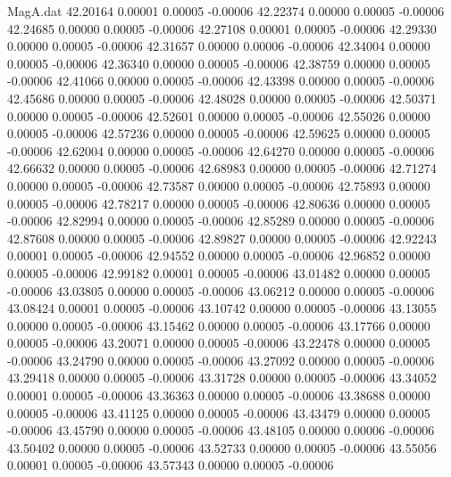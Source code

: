 \begin{filecontents}{MagA.dat}
  42.20164    0.00001    0.00005   -0.00006
  42.22374    0.00000    0.00005   -0.00006
  42.24685    0.00000    0.00005   -0.00006
  42.27108    0.00001    0.00005   -0.00006
  42.29330    0.00000    0.00005   -0.00006
  42.31657    0.00000    0.00006   -0.00006
  42.34004    0.00000    0.00005   -0.00006
  42.36340    0.00000    0.00005   -0.00006
  42.38759    0.00000    0.00005   -0.00006
  42.41066    0.00000    0.00005   -0.00006
  42.43398    0.00000    0.00005   -0.00006
  42.45686    0.00000    0.00005   -0.00006
  42.48028    0.00000    0.00005   -0.00006
  42.50371    0.00000    0.00005   -0.00006
  42.52601    0.00000    0.00005   -0.00006
  42.55026    0.00000    0.00005   -0.00006
  42.57236    0.00000    0.00005   -0.00006
  42.59625    0.00000    0.00005   -0.00006
  42.62004    0.00000    0.00005   -0.00006
  42.64270    0.00000    0.00005   -0.00006
  42.66632    0.00000    0.00005   -0.00006
  42.68983    0.00000    0.00005   -0.00006
  42.71274    0.00000    0.00005   -0.00006
  42.73587    0.00000    0.00005   -0.00006
  42.75893    0.00000    0.00005   -0.00006
  42.78217    0.00000    0.00005   -0.00006
  42.80636    0.00000    0.00005   -0.00006
  42.82994    0.00000    0.00005   -0.00006
  42.85289    0.00000    0.00005   -0.00006
  42.87608    0.00000    0.00005   -0.00006
  42.89827    0.00000    0.00005   -0.00006
  42.92243    0.00001    0.00005   -0.00006
  42.94552    0.00000    0.00005   -0.00006
  42.96852    0.00000    0.00005   -0.00006
  42.99182    0.00001    0.00005   -0.00006
  43.01482    0.00000    0.00005   -0.00006
  43.03805    0.00000    0.00005   -0.00006
  43.06212    0.00000    0.00005   -0.00006
  43.08424    0.00001    0.00005   -0.00006
  43.10742    0.00000    0.00005   -0.00006
  43.13055    0.00000    0.00005   -0.00006
  43.15462    0.00000    0.00005   -0.00006
  43.17766    0.00000    0.00005   -0.00006
  43.20071    0.00000    0.00005   -0.00006
  43.22478    0.00000    0.00005   -0.00006
  43.24790    0.00000    0.00005   -0.00006
  43.27092    0.00000    0.00005   -0.00006
  43.29418    0.00000    0.00005   -0.00006
  43.31728    0.00000    0.00005   -0.00006
  43.34052    0.00001    0.00005   -0.00006
  43.36363    0.00000    0.00005   -0.00006
  43.38688    0.00000    0.00005   -0.00006
  43.41125    0.00000    0.00005   -0.00006
  43.43479    0.00000    0.00005   -0.00006
  43.45790    0.00000    0.00005   -0.00006
  43.48105    0.00000    0.00006   -0.00006
  43.50402    0.00000    0.00005   -0.00006
  43.52733    0.00000    0.00005   -0.00006
  43.55056    0.00001    0.00005   -0.00006
  43.57343    0.00000    0.00005   -0.00006

\end{filecontents}
